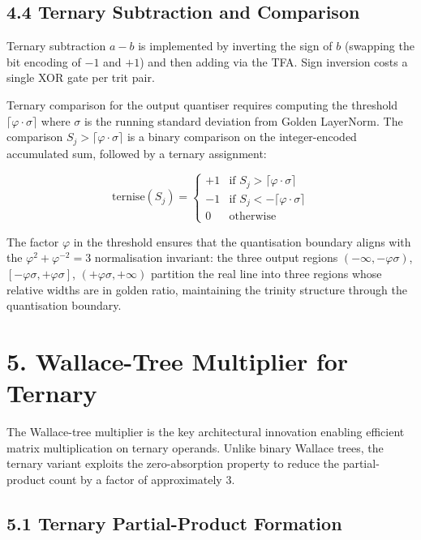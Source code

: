 \subsection{4.4 Ternary Subtraction and Comparison}

Ternary subtraction \(a - b\) is implemented by inverting the sign
of \(b\) (swapping the bit encoding of \(-1\) and \(+1\)) and
then adding via the TFA. Sign inversion costs a single XOR gate per
trit pair.

Ternary comparison for the output quantiser requires computing the
threshold \(\lceil \varphi \cdot \sigma \rceil\) where \(\sigma\) is
the running standard deviation from Golden LayerNorm. The comparison
\(S_j > \lceil \varphi \cdot \sigma \rceil\) is a binary comparison
on the integer-encoded accumulated sum, followed by a ternary
assignment:

\[
\mathrm{ternise}(S_j) =
\begin{cases}
+1 & \text{if } S_j > \lceil \varphi \cdot \sigma \rceil \\
-1 & \text{if } S_j < -\lceil \varphi \cdot \sigma \rceil \\
0 & \text{otherwise}
\end{cases}
\]

The factor \(\varphi\) in the threshold ensures that the quantisation
boundary aligns with the \(\varphi^2 + \varphi^{-2} = 3\) normalisation
invariant: the three output regions \((-\infty, -\varphi\sigma)\),
\([-\varphi\sigma, +\varphi\sigma]\),
\((+\varphi\sigma, +\infty)\) partition the real line into three
regions whose relative widths are in golden ratio, maintaining the
trinity structure through the quantisation boundary.

\section{5. Wallace-Tree Multiplier for Ternary}\label{fa_72:wallace-tree}

The Wallace-tree multiplier is the key architectural innovation enabling
efficient matrix multiplication on ternary operands. Unlike binary
Wallace trees, the ternary variant exploits the zero-absorption property
to reduce the partial-product count by a factor of approximately 3.

\subsection{5.1 Ternary Partial-Product Formation}

